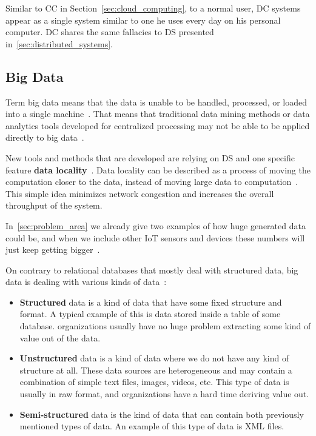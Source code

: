 Similar to CC in Section~\ref{sec:cloud_computing}, to a normal user, DC systems appear as a single system similar to one he uses every day on his personal computer. DC shares the same fallacies to DS presented in~\ref{sec:distributed_systems}.
%
%
\subsection{Big Data}\label{sec:big_data}
%
Term big data means that the data is unable to be handled, processed, or loaded into a single machine~\cite{FisherDCD12}. That means that traditional data mining methods or data analytics tools developed for centralized processing may not be able to be applied directly to big data~\cite{Tsai2015}. 

New tools and methods that are developed are relying on DS and one specific feature \textbf{data locality}~\label{ds:data_locality}. Data locality can be described as a process of moving the computation closer to the data, instead of moving large data to computation~\cite{GuoFZ12}. This simple idea minimizes network congestion and increases the overall throughput of the system.

In~\ref{sec:problem_area} we already give two examples of how huge generated data could be, and when we include other IoT sensors and devices these numbers will just keep getting bigger~\cite{SarigiannidisLR20}.

On contrary to relational databases that mostly deal with structured data, big data is dealing with various kinds of data~\cite{FisherDCD12, Tsai2015, GuoFZ12}:

\begin{itemize}
	\item \textbf{Structured} data is a kind of data that have some fixed structure and format. A typical example of this is data stored inside a table of some database. organizations usually have no huge problem extracting some kind of value out of the data.
	\item \textbf{Unstructured} data is a kind of data where we do not have any kind of structure at all. These data sources are heterogeneous and may contain a combination of simple text files, images, videos, etc. This type of data is usually in raw format, and organizations have a hard time deriving value out.
	\item \textbf{Semi-structured} data is the kind of data that can contain both previously mentioned types of data. An example of this type of data is XML files.
\end{itemize}

